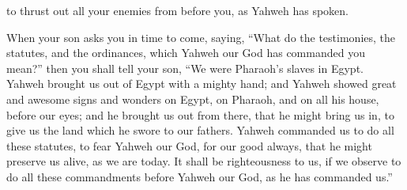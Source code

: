 {to thrust out all your enemies from before you, as Yahweh has spoken.
\par }{\PP {}When your son asks you in time to come, saying, “What do the testimonies, the statutes, and the ordinances, which Yahweh our God has commanded you mean?”
then you shall tell your son, “We were Pharaoh’s slaves in Egypt. Yahweh brought us out of Egypt with a mighty hand;
and Yahweh showed great and awesome signs and wonders on Egypt, on Pharaoh, and on all his house, before our eyes;
and he brought us out from there, that he might bring us in, to give us the land which he swore to our fathers.
Yahweh commanded us to do all these statutes, to fear Yahweh our God, for our good always, that he might preserve us alive, as we are today.
It shall be righteousness to us, if we observe to do all these commandments before Yahweh our God, as he has commanded us.”

}
